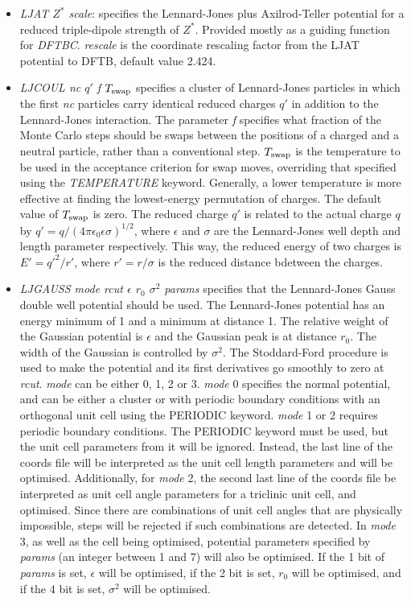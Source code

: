 \documentclass[12pt,a4paper,dvips]{article}
\begin{document}
\begin{itemize}
\item {\it LJAT $Z^*$ scale\/}: specifies the Lennard-Jones plus Axilrod-Teller 
potential for a reduced triple-dipole strength of $Z^*$.
Provided mostly as a guiding function for {\it DFTBC\/}. 
{\it rescale\/} is the coordinate rescaling factor from the LJAT potential
to DFTB, default value 2.424.

\item {\it LJCOUL nc $q'$ f $T_{\rm swap}$} specifies a cluster of Lennard-Jones particles in which the first {\it nc}
particles carry identical reduced charges {\it $q'$} in addition to the Lennard-Jones interaction.
The parameter {\it f} specifies what fraction of the Monte Carlo steps should be swaps between the
positions of a charged and a neutral particle, rather than a conventional step.
$T_{\rm swap}$ is the temperature to be used in the acceptance criterion for swap moves, overriding
that specified using the {\it TEMPERATURE} keyword.  Generally, a lower temperature is more effective
at finding the lowest-energy permutation of charges.  The default value of $T_{\rm swap}$ is zero.
The reduced charge $q'$ is related to the actual charge $q$ by $q'=q/(4\pi\epsilon_0\epsilon\sigma)^{1/2}$,
where $\epsilon$ and $\sigma$ are the Lennard-Jones well depth and length parameter respectively.
This way, the reduced energy of two charges is $E'=q'^2/r'$, where $r'=r/\sigma$ is the reduced distance
bdetween the charges.

\item {\it LJGAUSS mode rcut $\epsilon$ $r_0$ $\sigma^2$ params} specifies that the Lennard-Jones Gauss double well potential should be used.
The Lennard-Jones potential has an energy minimum of 1 and a minimum at distance 1.
The relative weight of the Gaussian potential is $\epsilon$ and the Gaussian peak is at distance $r_0$. The width of the Gaussian is
controlled by $\sigma^2$. The Stoddard-Ford procedure is used to make the potential and its first derivatives go smoothly to zero at {\it rcut}.
{\it mode} can be either 0, 1, 2 or 3. \textit{mode} 0 specifies the normal potential, and can be either a cluster or with periodic
boundary conditions with an orthogonal unit cell using the PERIODIC keyword. \textit{mode} 1 or 2 requires periodic boundary conditions.
The PERIODIC keyword must be used, but the unit cell parameters from it will be ignored. Instead, the last line of the coords file will
be interpreted as the unit cell length parameters and will be optimised. Additionally, for {\it mode} 2, the second
last line of the coords file be interpreted as unit cell angle parameters for a triclinic unit cell, and optimised. Since there
are combinations of unit cell angles that are physically impossible, steps will be rejected if such combinations are detected.
In \textit{mode} 3, as well as the cell being optimised, potential parameters specified by \textit{params} (an integer between 1 and 7)
will also be optimised. If the 1 bit of \textit{params} is set, $\epsilon$ will be optimised, if the 2 bit is set, $r_0$ will be optimised,
and if the 4 bit is set, $\sigma^2$ will be optimised.


\end{itemize}
\end{document}
